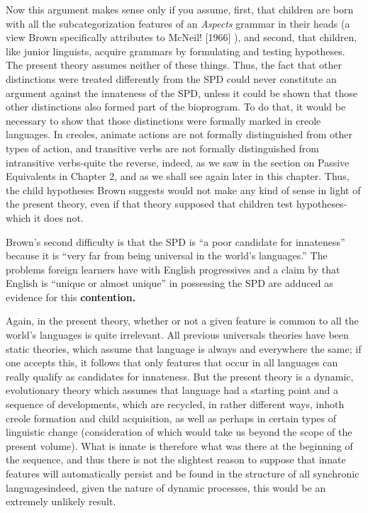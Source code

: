 Now this argument makes sense only if you assume, first, that
% 
children are born with all the subcategorization features of an \textit{Aspects} grammar in their heads (a view Brown specifically attributes to McNeil! [1966] ), and second, that children, like junior linguists, acquire gram\-mars by formulating and testing hypotheses. The present theory as\-sumes neither of these things. Thus, the fact that other distinctions were treated differently from the SPD could never constitute an argu\-ment against the innateness of the SPD, unless it could be shown that those other distinctions also formed part of the bioprogram. To do that, it would be necessary to show that those distinctions were for\-mally marked in creole languages. In creoles, animate actions are not formally distinguished from other types of action, and transitive verbs are not formally distinguished from intransitive verbs-quite the reverse, indeed, as we saw in the section on Passive Equivalents in Chapter 2, and as we shall see again later in this chapter. Thus, the child hy\-potheses Brown suggests would not make any kind of sense in light of the present theory, even if that theory supposed that children test hypotheses-which it does not.

Brown's second difficulty is that the SPD is ``a poor candidate
for innateness'' because it is ``very far from being universal in the world's languages.'' The problems foreign learners have with English progressives and a claim by \citet{Joos1964} that English is ``unique or almost unique'' in possessing the SPD are adduced as evidence for this \textbf{contention.}

Again, in the present theory, whether or not a given feature is common to all the world's languages is quite irrelevant. All previous universals theories have been static theories, which assume that lan\-guage is always and everywhere the same; if one accepts this, it follows that only features that occur in all languages can really qualify as can\-didates for innateness. But the present theory is a dynamic, evolu\-tionary theory which assumes that language had a starting point and a sequence of developments, which are recycled, in rather different ways, inhoth creole formation and child acquisition, as well as perhaps in certain types of linguistic change (consideration of which would take us beyond the scope of the present volume). What is innate is therefore
what was there at the beginning of the sequence, and thus there is not the slightest reason to suppose that innate features will automati\-cally persist and be found in the structure of all synchronic languages\-indeed, given the nature of dynamic processes, this would be an extremely unlikely result.

